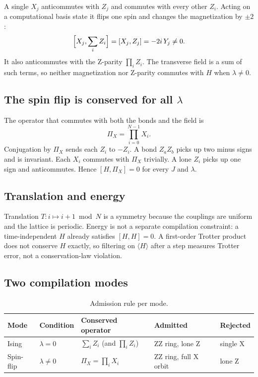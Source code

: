 \documentclass[11pt]{article}
\theoremstyle{definition}
\newcommand{\PiX}{\Pi_X}
\begin{document}
A single $X_j$ anticommutes with $Z_j$ and commutes with every other $Z_i$. Acting on a computational basis state it flips one spin and changes the magnetization by $\pm 2$:
\begin{equation}
  \Bigl[X_j, \sum_i Z_i\Bigr] = [X_j, Z_j] = -2i\,Y_j \neq 0 .
\end{equation}
It also anticommutes with the Z-parity $\prod_i Z_i$. The transverse field is a sum of such terms, so neither magnetization nor Z-parity commutes with $H$ when $\lambda \neq 0$.

\subsection{The spin flip is conserved for all \texorpdfstring{$\lambda$}{lambda}}

The operator that commutes with both the bonds and the field is
\begin{equation}
  \PiX = \prod_{i=0}^{N-1} X_i .
\end{equation}
Conjugation by $\PiX$ sends each $Z_i$ to $-Z_i$. A bond $Z_a Z_b$ picks up two minus signs and is invariant. Each $X_i$ commutes with $\PiX$ trivially. A lone $Z_i$ picks up one sign and anticommutes. Hence $[H, \PiX] = 0$ for every $J$ and $\lambda$.

\subsection{Translation and energy}

Translation $T\colon i \mapsto i + 1 \bmod N$ is a symmetry because the couplings are uniform and the lattice is periodic. Energy is not a separate compilation constraint: a time-independent $H$ already satisfies $[H, H] = 0$. A first-order Trotter product does not conserve $H$ exactly, so filtering on $\langle H \rangle$ after a step measures Trotter error, not a conservation-law violation.

\subsection{Two compilation modes}

\begin{table}[h]
\centering
\begin{tabular}{@{}lllll@{}}
\toprule
Mode & Condition & Conserved operator & Admitted & Rejected \\
\midrule
Ising & $\lambda = 0$ & $\sum_i Z_i$ (and $\prod_i Z_i$) & ZZ ring, lone Z & single X \\
Spin-flip & $\lambda \neq 0$ & $\PiX = \prod_i X_i$ & ZZ ring, full X orbit & lone Z \\
\bottomrule
\end{tabular}
\caption{Admission rule per mode.}
\label{tab:modes}
\end{table}
\end{document}

